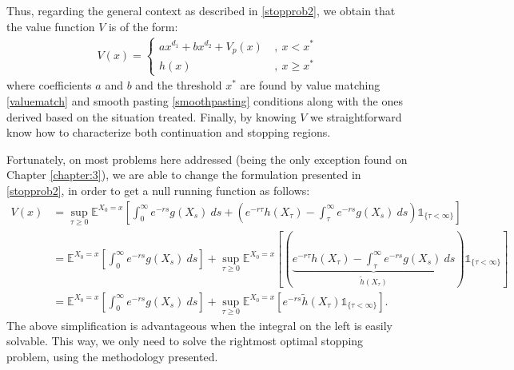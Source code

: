 Thus, regarding the general context as described in \eqref{stopprob2}, we obtain that the value function $V$ is of the form:
\begin{align}
V(x)=\begin{cases}
ax^{d_1}+bx^{d_2}+V_p(x) \ &, \ x<x^*\\
h(x) \ &, \ x\geq x^*
\end{cases}
\label{sol}
\end{align}
where coefficients $a$ and $b$ and the threshold $x^*$ are found by value matching \eqref{valuematch} and smooth pasting \eqref{smoothpasting} conditions along with the ones derived based on the situation treated. Finally, by knowing $V$ we straightforward know how to characterize both continuation and stopping regions.



Fortunately, on most problems here addressed (being the only exception found on Chapter \ref{chapter:3}), we are able to change the formulation presented in \eqref{stopprob2}, in order to get a null running function as follows:
\begin{align}
V(x)&=\sup_{\tau \geq 0} \mathds{E}^{X_0=x}\left[  \int^\infty_0 e^{-r s} g(X_s) \ ds +\left( e^{-r \tau}h(X_\tau)  -   \int_\tau^\infty e^{-r s} g(X_s) \ ds \right) \mathds{1}_{ \{\tau< \infty \}} \right] \nonumber \\
& = \mathds{E}^{X_0=x}\left[ \int^\infty_0 e^{-r s} g(X_s) \ ds \right] + \sup_{\tau \geq 0} \mathds{E}^{X_0=x}\left[ \left( \underbrace{  e^{-r \tau}h(X_\tau) - \int_\tau^\infty e^{-r s} g(X_s) \ ds}_{\widetilde{h}(X_\tau)} \right) \mathds{1}_{ \{\tau< \infty \}} \right] \nonumber \\
& =  \mathds{E}^{X_0=x}\left[ \int^\infty_0 e^{-r s} g(X_s) \ ds \right]+ \sup_{\tau \geq 0}\mathds{E}^{X_0=x}\left[ e^{-r s}\widetilde{h}(X_\tau) \mathds{1}_{ \{\tau< \infty \}} \right] \label{bc_confuso}.
\end{align}
The above simplification is advantageous when the integral on the left is easily solvable. This way, we only need to solve the rightmost optimal stopping problem, using the methodology presented.









